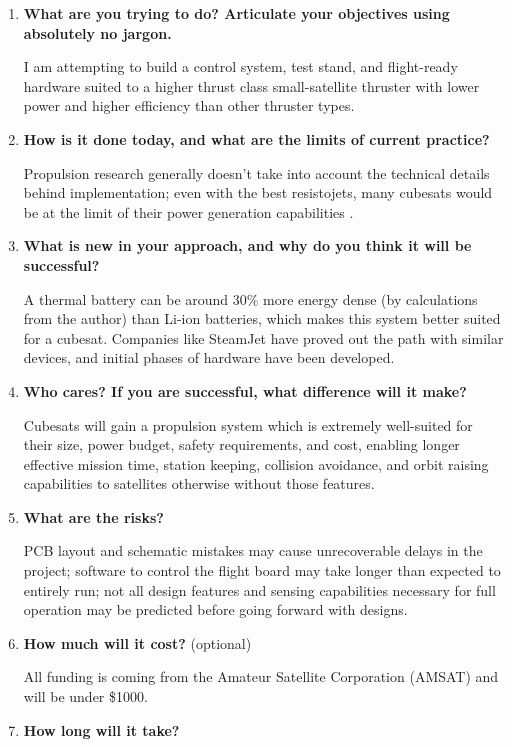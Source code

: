 \begin{enumerate}
  \item \textbf{What are you trying to do? Articulate your objectives using
    absolutely no jargon.}\par
    I am attempting to build a control system, test stand, and flight-ready hardware suited to a higher thrust class small-satellite thruster with lower power and higher efficiency than other thruster types.
  \item \textbf{How is it done today, and what are the limits of current
    practice?}\par
    Propulsion research generally doesn't take into account the technical details behind implementation\cite{tummalaOverviewCubeSatellitePropulsion2017}; even with the best resistojets, many cubesats would be at the limit of their power generation capabilities \cite{clarkHugePowerDemandItsyBitsy2010}.
  \item \textbf{What is new in your approach, and why do you think it will be
    successful?}\par
     A thermal battery can be around 30\% more energy dense (by calculations from the author) than Li-ion batteries, which makes this system better suited for a cubesat. Companies like SteamJet have proved out the path with similar devices, and initial phases of hardware have been developed.
  \item \textbf{Who cares? If you are successful, what difference will it
    make?}\par
    Cubesats will gain a propulsion system which is extremely well-suited for their size, power budget, safety requirements, and cost, enabling longer effective mission time, station keeping, collision avoidance, and orbit raising capabilities to satellites otherwise without those features.
  \item \textbf{What are the risks?}\par
    PCB layout and schematic mistakes may cause unrecoverable delays in the project; software to control the flight board may take longer than expected to entirely run; not all design features and sensing capabilities necessary for full operation may be predicted before going forward with designs.
  \item \textbf{How much will it cost?} (optional)\par
    All funding is coming from the Amateur Satellite Corporation (AMSAT) and will be under \$1000.
  \item \textbf{How long will it take?}\par

\end{enumerate}
